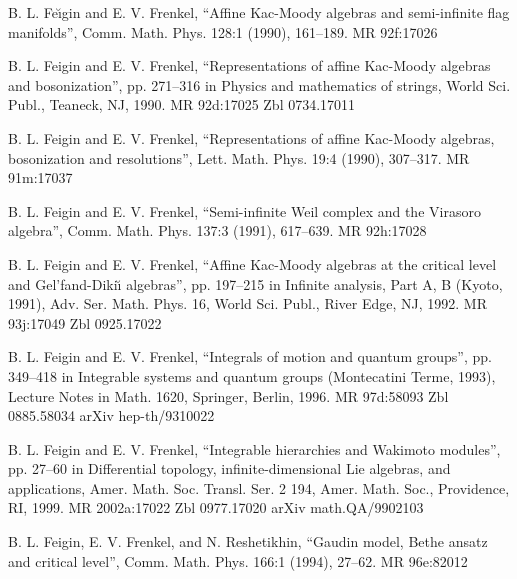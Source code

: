 \par{} B. L. Fe\u{\i}gin and E. V. Frenkel, ``Affine Kac-Moody algebras and semi-infinite flag manifolds'', Comm. Math. Phys. 128:1 (1990), 161--189. MR 92f:17026

\par{} B. L. Feigin and E. V. Frenkel, ``Representations of affine Kac-Moody algebras and bosonization'', pp. 271--316 in Physics and mathematics of strings, World Sci. Publ., Teaneck, NJ, 1990. MR 92d:17025 Zbl 0734.17011

\par{} B. L. Feigin and E. V. Frenkel, ``Representations of affine Kac-Moody algebras, bosonization and resolutions'', Lett. Math. Phys. 19:4 (1990), 307--317. MR 91m:17037

\par{} B. L. Feigin and E. V. Frenkel, ``Semi-infinite Weil complex and the Virasoro algebra'', Comm. Math. Phys. 137:3 (1991), 617--639. MR 92h:17028

\par{} B. L. Feigin and E. V. Frenkel, ``Affine Kac-Moody algebras at the critical level and Gel'fand-Diki\u{\i} algebras'', pp. 197--215 in Infinite analysis, Part A, B (Kyoto, 1991), Adv. Ser. Math. Phys. 16, World Sci. Publ., River Edge, NJ, 1992. MR 93j:17049 Zbl 0925.17022

\par{} B. L. Feigin and E. V. Frenkel, ``Integrals of motion and quantum groups'', pp. 349--418 in Integrable systems and quantum groups (Montecatini Terme, 1993), Lecture Notes in Math. 1620, Springer, Berlin, 1996. MR 97d:58093 Zbl 0885.58034 arXiv hep-th/9310022

\par{} B. L. Feigin and E. V. Frenkel, ``Integrable hierarchies and Wakimoto modules'', pp. 27--60 in Differential topology, infinite-dimensional Lie algebras, and applications, Amer. Math. Soc. Transl. Ser. 2 194, Amer. Math. Soc., Providence, RI, 1999. MR 2002a:17022 Zbl 0977.17020 arXiv math.QA/9902103

\par\noindent [Feigin et al. 1994] B. L. Feigin, E. V. Frenkel, and N. Reshetikhin, ``Gaudin model, Bethe ansatz and critical level'', Comm. Math. Phys. 166:1 (1994), 27--62. MR 96e:82012

